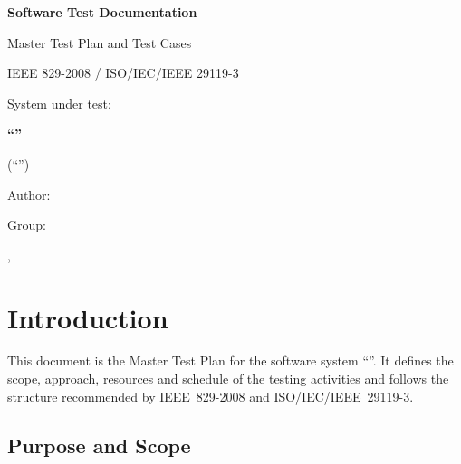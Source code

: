 \documentclass[12pt,a4paper]{extarticle}
\begin{document}
\sloppy

\begin{center}
{\large\bfseries Software Test Documentation\par}
\vspace{0.2cm}
{\normalsize Master Test Plan and Test Cases\par}
\vspace{0.15cm}
{\normalsize IEEE 829-2008 / ISO/IEC/IEEE 29119-3\par}
\vspace{0.9cm}
{\large System under test:\par}
\vspace{0.2cm}
{\Large\bfseries \enquote{\hseProjectNameEn}\par}
\vspace{0.15cm}
{\normalsize (\enquote{\projectname})\par}
\vspace{1.2cm}
{\normalsize Author: \hseAuthorName\par}
\vspace{0.1cm}
{\normalsize Group: \hseGroup\par}
\vspace{0.1cm}
{\normalsize \hseCity, \hseYear\par}
\end{center}

\vspace{0.5cm}

\hypersetup{linkcolor=black}
\tableofcontents
\hypersetup{linkcolor=blue}
\clearpage


\section{Introduction}

This document is the Master Test Plan for the software system \enquote{\hseProjectNameEn}. It defines the scope, approach, resources and schedule of the testing activities and follows the structure recommended by IEEE~829-2008 and ISO/IEC/IEEE~29119-3.

\subsection{Purpose and Scope}
\end{document}
